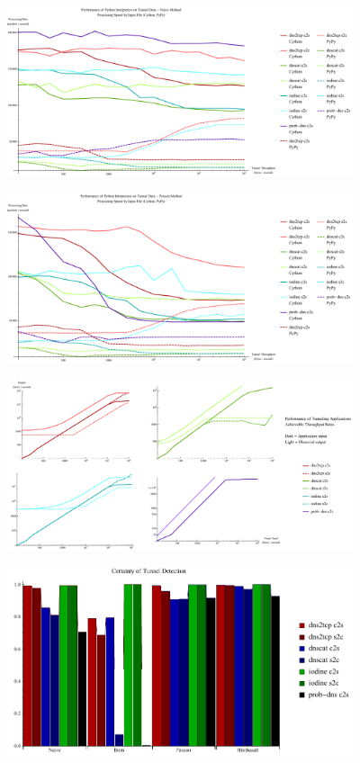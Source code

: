 \documentclass[12pt]{report}
\theoremstyle{remark}
\theoremstyle{definition}
\theoremstyle{definition}
\theoremstyle{definition}
\begin{document}
\begin{figure}
\centering
\includegraphics[width=4in]{figures/ppi-naive.pdf}
\end{figure}
\begin{figure}
\centering
\includegraphics[width=4in]{figures/ppi-paxson.pdf}
\end{figure}
\begin{figure}
\centering
\includegraphics[width=4in]{figures/tunrates.pdf}
\end{figure}
\begin{figure}
\centering
\includegraphics[width=4in]{figures/cplot.pdf}
\end{figure}
\clearpage
\end{document}
